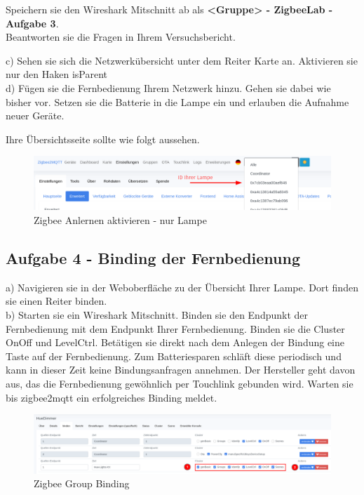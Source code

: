 \begin{Aufgabe}
    Speichern sie den Wireshark Mitschnitt ab als \textbf{\grqq <Gruppe> - ZigbeeLab - Aufgabe 3\grqq{}}. \\
    Beantworten sie die Fragen in Ihrem Versuchsbericht.
\end{Aufgabe}

c) Sehen sie sich die Netzwerkübersicht unter dem Reiter \grqq Karte\grqq{} an. Aktivieren sie nur den Haken \grqq isParent\grqq{} \\
d) Fügen sie die Fernbedienung Ihrem Netzwerk hinzu. Gehen sie dabei wie bisher vor. Setzen sie die Batterie in die Lampe ein und erlauben die Aufnahme neuer Geräte.

Ihre Übersichtsseite sollte wie folgt aussehen.

\begin{figure}[H]
    \centering
    \includegraphics[width=1\textwidth]{media/Z2M-Anlernen-Lampe.png}
    \caption{Zigbee Anlernen aktivieren - nur Lampe}
\end{figure}


\subsection{Aufgabe 4 - Binding der Fernbedienung}

a) Navigieren sie in der Weboberfläche zu der Übersicht Ihrer Lampe. Dort finden sie einen Reiter \grqq binden\grqq{}. \\
b) Starten sie ein Wireshark Mitschnitt. Binden sie den Endpunkt der Fernbedienung mit dem Endpunkt Ihrer Fernbedienung. Binden sie die Cluster \grqq OnOff\grqq{}
und \grqq LevelCtrl\grqq{}. Betätigen sie direkt nach dem Anlegen der Bindung eine Taste auf der Fernbedienung. Zum Batteriesparen \grqq schläft\grqq{} diese 
periodisch und kann in dieser Zeit keine Bindungsanfragen annehmen. Der Hersteller geht davon aus, das die Fernbedienung gewöhnlich per Touchlink gebunden wird. 
Warten sie bis zigbee2mqtt ein erfolgreiches Binding meldet. \\

\begin{figure}[H]
    \centering
    \includegraphics[width=1\textwidth]{media/Z2M-Group-Binding.png}
    \caption{Zigbee Group Binding}
\end{figure}

